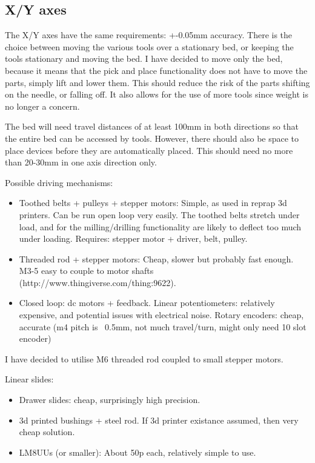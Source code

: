 \documentclass[a4paper,11pt]{article}  %
\begin{document}
\subsection{X/Y axes}

The X/Y axes have the same requirements: +-0.05mm accuracy. There is the choice between moving the various tools over a stationary
bed, or keeping the tools stationary and moving the bed. I have decided to move only the bed, because it means that the pick
and place functionality does not have to move the parts, simply lift and lower them. This should reduce the risk of the parts
shifting on the needle, or falling off. It also allows for the use of more tools since weight is no longer a concern.

The bed will need travel distances of at least 100mm in both directions so that the entire bed can be accessed by tools. However,
there should also be space to place devices before they are automatically placed. This should need no more than 20-30mm in one axis
direction only.

Possible driving mechanisms:

\begin{itemize}
	\item	Toothed belts + pulleys + stepper motors: Simple, as used in reprap 3d printers. Can be run open loop
		very easily. The toothed belts stretch under load, and for the milling/drilling functionality are likely to deflect too much under loading.
		Requires: stepper motor + driver, belt, pulley.
	\item	Threaded rod + stepper motors: Cheap, slower but probably fast enough. M3-5 easy to couple
		to motor shafts (http://www.thingiverse.com/thing:9622).
	\item	Closed loop: dc motors + feedback. Linear potentiometers: relatively expensive, and potential
		issues with electrical noise. Rotary encoders: cheap, accurate (m4 pitch is ~0.5mm, not much
		travel/turn, might only need 10 slot encoder)

\end{itemize}

I have decided to utilise M6 threaded rod coupled to small stepper motors.

Linear slides:

\begin{itemize}
	\item	Drawer slides: cheap, surprisingly high precision.
	\item	3d printed bushings + steel rod. If 3d printer existance assumed, then very cheap solution.
	\item	LM8UUs (or smaller): About 50p each, relatively simple to use.
\end{itemize}
\end{document}
